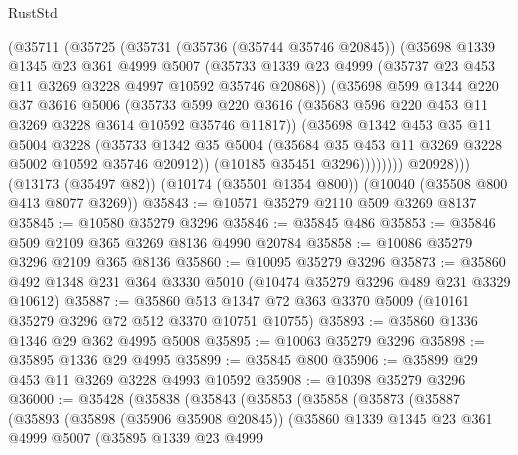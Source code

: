 \begin{lexlean}{RustStd}
\begin{coremodule}
            (@35711
              (@35725
                (@35731
                  (@35736 (@35744 @35746 @20845))
                  (@35698
                    @1339
                    @1345
                    @23
                    @361
                    @4999
                    @5007
                    (@35733
                      @1339
                      @23
                      @4999
                      (@35737 @23 @453 @11 @3269 @3228 @4997 @10592 @35746 @20868))
                    (@35698
                      @599
                      @1344
                      @220
                      @37
                      @3616
                      @5006
                      (@35733
                        @599
                        @220
                        @3616
                        (@35683 @596 @220 @453 @11 @3269 @3228 @3614 @10592 @35746 @11817))
                      (@35698
                        @1342
                        @453
                        @35
                        @11
                        @5004
                        @3228
                        (@35733
                          @1342
                          @35
                          @5004
                          (@35684 @35 @453 @11 @3269 @3228 @5002 @10592 @35746 @20912))
                        (@10185 @35451 @3296))))))))
          @20928)))
    (@13173 (@35497 @82))
    (@10174 (@35501 @1354 @800))
    (@10040 (@35508 @800 @413 @8077 @3269))
@35843 := @10571 @35279 @2110 @509 @3269 @8137
@35845 := @10580 @35279 @3296
@35846 := @35845 @486
@35853 := @35846 @509 @2109 @365 @3269 @8136 @4990 @20784
@35858 := @10086 @35279 @3296 @2109 @365 @8136
@35860 := @10095 @35279 @3296
@35873 := @35860 @492 @1348 @231 @364 @3330 @5010 (@10474 @35279 @3296 @489 @231 @3329 @10612)
@35887 := @35860 @513 @1347 @72 @363 @3370 @5009 (@10161 @35279 @3296 @72 @512 @3370 @10751 @10755)
@35893 := @35860 @1336 @1346 @29 @362 @4995 @5008
@35895 := @10063 @35279 @3296
@35898 := @35895 @1336 @29 @4995
@35899 := @35845 @800
@35906 := @35899 @29 @453 @11 @3269 @3228 @4993 @10592
@35908 := @10398 @35279 @3296
@36000 := @35428
    (@35838
      (@35843
        (@35853
          (@35858
            (@35873
              (@35887
                (@35893
                  (@35898 (@35906 @35908 @20845))
                  (@35860
                    @1339
                    @1345
                    @23
                    @361
                    @4999
                    @5007
                    (@35895
                      @1339
                      @23
                      @4999

\end{coremodule}
\end{lexlean}
